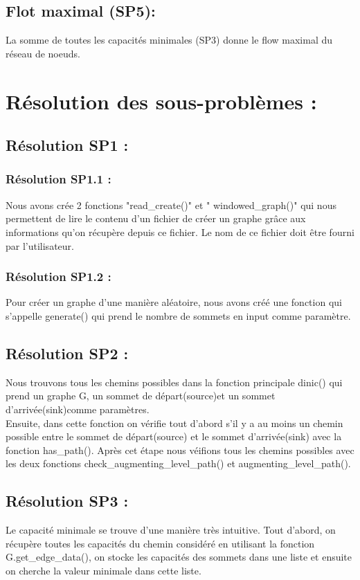 \documentclass[a4paper, 11pt, oneside]{article}
\begin{document}
\subsection{Flot maximal (SP5):}

La somme de toutes les capacités minimales (SP3) donne le flow maximal du réseau de noeuds. 

\section{\textbf{Résolution des sous-problèmes :}}

\subsection{Résolution SP1 :}
\subsubsection{Résolution SP1.1 :}
Nous avons crée 2 fonctions "read\_create()" et " windowed\_graph()" qui nous permettent de lire le contenu d’un fichier de créer un graphe grâce aux informations qu’on récupère depuis ce fichier. Le nom de ce fichier doit être fourni par l’utilisateur.

\subsubsection{Résolution SP1.2 :}
Pour créer un graphe d'une manière aléatoire, nous avons créé une fonction qui s'appelle generate() qui prend le nombre de sommets en input comme paramètre.

\subsection{Résolution SP2 :}

Nous trouvons tous les chemins possibles dans la fonction principale dinic() qui prend un graphe G, un sommet de départ(source)et un sommet d'arrivée(sink)comme paramètres.\\
Ensuite, dans cette fonction on vérifie tout d'abord s'il y a au moins un chemin possible entre le sommet de départ(source) et le sommet d'arrivée(sink) avec la fonction has\_path(). Après cet étape nous véifions tous les chemins possibles avec les deux fonctions check\_augmenting\_level\_path() et augmenting\_level\_path().

\subsection{Résolution SP3 :}
Le capacité minimale se trouve d'une manière très intuitive. Tout d'abord, on récupère toutes les capacités du chemin considéré en utilisant la fonction G.get\_edge\_data(), on stocke les capacités des sommets dans une liste et ensuite on cherche la valeur minimale dans cette liste.
\end{document}
